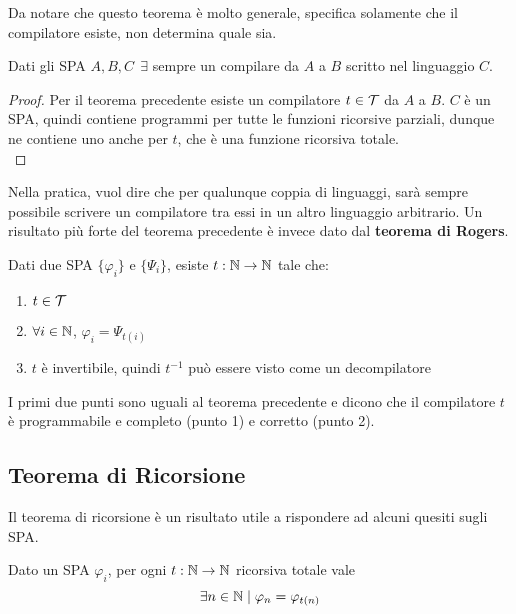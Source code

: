 Da notare che questo teorema è molto generale, specifica solamente che il compilatore esiste, non determina quale sia. \\

\begin{coroll}
	Dati gli SPA $A,B,C \ \ \exists$ sempre un compilare da $A$ a $B$ scritto nel linguaggio $C$.
\end{coroll}
\begin{proof}
	Per il teorema precedente esiste un compilatore $t \in \mathcal{T}$ da $A$ a $B$. $C$ è un SPA, quindi contiene programmi per tutte le funzioni ricorsive parziali, dunque ne contiene uno anche per $t$, che è una funzione ricorsiva totale. \\
\end{proof}

Nella pratica, vuol dire che per qualunque coppia di linguaggi, sarà sempre possibile scrivere un compilatore tra essi in un altro linguaggio arbitrario. Un risultato più forte del teorema precedente è invece dato dal \textbf{teorema di Rogers}.\\

\begin{theor}
	Dati due SPA $\{\varphi_i\}$ e $\{\Psi_i\}$, esiste $t: \mathbb{N} \rightarrow \mathbb{N}$ tale che:
	\begin{enumerate}
		\item $t \in \mathcal{T}$ %
		
        \item $\forall i \in \mathbb{N}$, $\varphi_i = \Psi_{t(i)}$ %
		
        \item $t$ è invertibile, quindi $t^{-1}$ può essere visto come un decompilatore
	\end{enumerate}
\end{theor}

I primi due punti sono uguali al teorema precedente e dicono che il compilatore $t$ è programmabile e completo (punto 1) e corretto (punto 2).

\subsection{Teorema di Ricorsione}

Il teorema di ricorsione è un risultato utile a rispondere ad alcuni quesiti sugli SPA. \\

\begin{theor}
	Dato un SPA $\varphi_i$, per ogni $t: \mathbb{N} \rightarrow \mathbb{N}$ ricorsiva totale vale
	$$ \exists n \in \mathbb{N} \mid \varphi_n = \varphi_{t(n)} $$
\end{theor}

